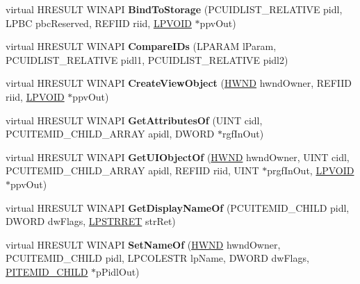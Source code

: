 \begin{DoxyCompactItemize}
virtual H\+R\+E\+S\+U\+LT W\+I\+N\+A\+PI {\bfseries Bind\+To\+Storage} (P\+C\+U\+I\+D\+L\+I\+S\+T\+\_\+\+R\+E\+L\+A\+T\+I\+VE pidl, L\+P\+BC pbc\+Reserved, R\+E\+F\+I\+ID riid, \hyperlink{interfacevoid}{L\+P\+V\+O\+ID} $\ast$ppv\+Out)
\item 
\mbox{\label{class_c_network_connections_a633cc4c7757907d59ce18d8a94a8eba2}} 
virtual H\+R\+E\+S\+U\+LT W\+I\+N\+A\+PI {\bfseries Compare\+I\+Ds} (L\+P\+A\+R\+AM l\+Param, P\+C\+U\+I\+D\+L\+I\+S\+T\+\_\+\+R\+E\+L\+A\+T\+I\+VE pidl1, P\+C\+U\+I\+D\+L\+I\+S\+T\+\_\+\+R\+E\+L\+A\+T\+I\+VE pidl2)
\item 
\mbox{\label{class_c_network_connections_ab9aa550fc5232b6df07b732ef6390dbe}} 
virtual H\+R\+E\+S\+U\+LT W\+I\+N\+A\+PI {\bfseries Create\+View\+Object} (\hyperlink{interfacevoid}{H\+W\+ND} hwnd\+Owner, R\+E\+F\+I\+ID riid, \hyperlink{interfacevoid}{L\+P\+V\+O\+ID} $\ast$ppv\+Out)
\item 
\mbox{\label{class_c_network_connections_a03973f3519332820c3d755f905b52fed}} 
virtual H\+R\+E\+S\+U\+LT W\+I\+N\+A\+PI {\bfseries Get\+Attributes\+Of} (U\+I\+NT cidl, P\+C\+U\+I\+T\+E\+M\+I\+D\+\_\+\+C\+H\+I\+L\+D\+\_\+\+A\+R\+R\+AY apidl, D\+W\+O\+RD $\ast$rgf\+In\+Out)
\item 
\mbox{\label{class_c_network_connections_a053ed2c0df324f996fd30ee234fd9128}} 
virtual H\+R\+E\+S\+U\+LT W\+I\+N\+A\+PI {\bfseries Get\+U\+I\+Object\+Of} (\hyperlink{interfacevoid}{H\+W\+ND} hwnd\+Owner, U\+I\+NT cidl, P\+C\+U\+I\+T\+E\+M\+I\+D\+\_\+\+C\+H\+I\+L\+D\+\_\+\+A\+R\+R\+AY apidl, R\+E\+F\+I\+ID riid, U\+I\+NT $\ast$prgf\+In\+Out, \hyperlink{interfacevoid}{L\+P\+V\+O\+ID} $\ast$ppv\+Out)
\item 
\mbox{\label{class_c_network_connections_ab48fd7bcb140ef1441c6d3adc1b4c46b}} 
virtual H\+R\+E\+S\+U\+LT W\+I\+N\+A\+PI {\bfseries Get\+Display\+Name\+Of} (P\+C\+U\+I\+T\+E\+M\+I\+D\+\_\+\+C\+H\+I\+LD pidl, D\+W\+O\+RD dw\+Flags, \hyperlink{struct___s_t_r_r_e_t}{L\+P\+S\+T\+R\+R\+ET} str\+Ret)
\item 
\mbox{\label{class_c_network_connections_ab7a9ea0ad6868895bee73c156829c7af}} 
virtual H\+R\+E\+S\+U\+LT W\+I\+N\+A\+PI {\bfseries Set\+Name\+Of} (\hyperlink{interfacevoid}{H\+W\+ND} hwnd\+Owner, P\+C\+U\+I\+T\+E\+M\+I\+D\+\_\+\+C\+H\+I\+LD pidl, L\+P\+C\+O\+L\+E\+S\+TR lp\+Name, D\+W\+O\+RD dw\+Flags, \hyperlink{struct___i_t_e_m_i_d___c_h_i_l_d}{P\+I\+T\+E\+M\+I\+D\+\_\+\+C\+H\+I\+LD} $\ast$p\+Pidl\+Out)

\end{DoxyCompactItemize}

